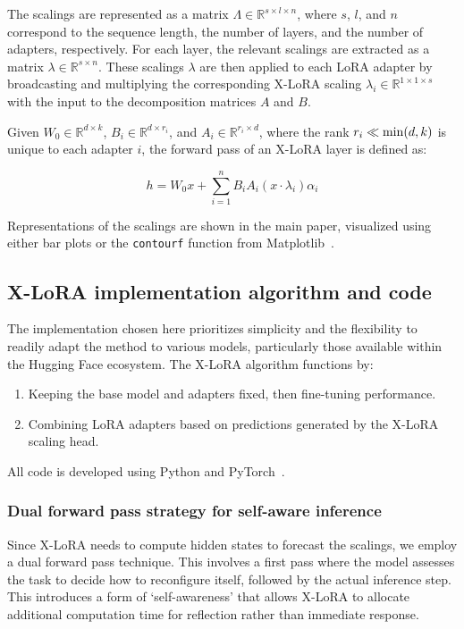 The scalings are represented as a matrix $\Lambda \in \mathbb{R}^{s \times l \times n}$, where $s$, $l$, and $n$ correspond to the sequence length, the number of layers, and the number of adapters, respectively. For each layer, the relevant scalings are extracted as a matrix $\lambda \in \mathbb{R}^{s \times n}$. These scalings $\lambda$ are then applied to each LoRA adapter by broadcasting and multiplying the corresponding X-LoRA scaling $\lambda_i \in \mathbb{R}^{1 \times 1 \times s}$ with the input to the decomposition matrices $A$ and $B$.

Given $W_0 \in \mathbb{R}^{d \times k}$, $B_i \in \mathbb{R}^{d \times r_i}$, and $A_i \in \mathbb{R}^{r_i \times d}$, where the rank $r_i \ll {\rm min} (d,k)$ is unique to each adapter $i$, the forward pass of an X-LoRA layer is defined as:

\begin{equation}
    h = W_0 x + \sum_{i=1}^{n} B_i A_i (x \cdot \lambda_i) \alpha_i
\end{equation}

Representations of the scalings are shown in the main paper, visualized using either bar plots or the \texttt{contourf} function from Matplotlib~\cite{MatplotlibDocumentation}.

\subsection{X-LoRA implementation algorithm and code} The implementation chosen here prioritizes simplicity and the flexibility to readily adapt the method to various models, particularly those available within the Hugging Face ecosystem. The X-LoRA algorithm functions by:

\begin{enumerate}
    \item Keeping the base model and adapters fixed, then fine-tuning performance.
    \item Combining LoRA adapters based on predictions generated by the X-LoRA scaling head.
\end{enumerate}

All code is developed using Python and PyTorch~\cite{Paszke2019PyTorchLibrary}.

\subsubsection{Dual forward pass strategy for self-aware inference} Since X-LoRA needs to compute hidden states to forecast the scalings, we employ a dual forward pass technique. This involves a first pass where the model assesses the task to decide how to reconfigure itself, followed by the actual inference step. This introduces a form of `self-awareness' that allows X-LoRA to allocate additional computation time for reflection rather than immediate response.

